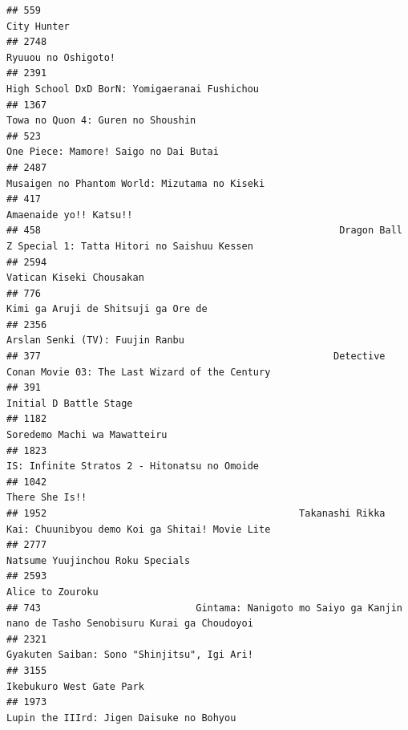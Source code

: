 \documentclass[
]{article}
\begin{document}
\begin{verbatim}
## 559                                                                                                City Hunter
## 2748                                                                                       Ryuuou no Oshigoto!
## 2391                                                              High School DxD BorN: Yomigaeranai Fushichou
## 1367                                                                         Towa no Quon 4: Guren no Shoushin
## 523                                                                      One Piece: Mamore! Saigo no Dai Butai
## 2487                                                             Musaigen no Phantom World: Mizutama no Kiseki
## 417                                                                                     Amaenaide yo!! Katsu!!
## 458                                                    Dragon Ball Z Special 1: Tatta Hitori no Saishuu Kessen
## 2594                                                                                  Vatican Kiseki Chousakan
## 776                                                                        Kimi ga Aruji de Shitsuji ga Ore de
## 2356                                                                           Arslan Senki (TV): Fuujin Ranbu
## 377                                                   Detective Conan Movie 03: The Last Wizard of the Century
## 391                                                                                     Initial D Battle Stage
## 1182                                                                              Soredemo Machi wa Mawatteiru
## 1823                                                              IS: Infinite Stratos 2 - Hitonatsu no Omoide
## 1042                                                                                            There She Is!!
## 1952                                            Takanashi Rikka Kai: Chuunibyou demo Koi ga Shitai! Movie Lite
## 2777                                                                          Natsume Yuujinchou Roku Specials
## 2593                                                                                          Alice to Zouroku
## 743                           Gintama: Nanigoto mo Saiyo ga Kanjin nano de Tasho Senobisuru Kurai ga Choudoyoi
## 2321                                                               Gyakuten Saiban: Sono "Shinjitsu", Igi Ari!
## 3155                                                                                  Ikebukuro West Gate Park
## 1973                                                                  Lupin the IIIrd: Jigen Daisuke no Bohyou

\end{verbatim}
\end{document}

